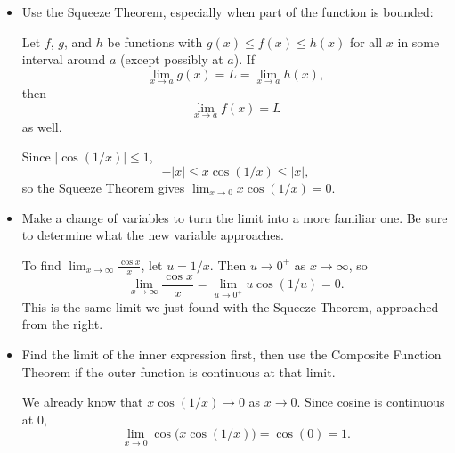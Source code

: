 \begin{itemize}
\item Use the Squeeze Theorem, especially when part of the function is bounded:

\begin{thm}
Let $f$, $g$, and $h$ be functions with $g(x)\leq f(x)\leq h(x)$ for all $x$ in some interval around $a$ (except possibly at $a$). If $$\lim_{x\to a}g(x)=L=\lim_{x\to a} h(x),$$ then $$\lim_{x\to a} f(x)=L$$
as well.
\end{thm}
\begin{exampleblock}
Since $\left|\cos(1/x)\right|\leq 1$,
$$-|x|\leq x\cos(1/x)\leq |x|,$$
so the Squeeze Theorem gives $\displaystyle\lim_{x\to0}x\cos(1/x)=0$.
\end{exampleblock}

\item Make a change of variables to turn the limit into a more familiar one. Be sure to determine what the new variable approaches.
\begin{exampleblock}
To find $\displaystyle\lim_{x\to\infty}\frac{\cos x}{x}$,
let $u=1/x$. Then $u\to0^+$ as $x\to\infty$, so
$$\lim_{x\to\infty}\frac{\cos x}{x}
=\lim_{u\to0^+}u\cos(1/u)=0.$$
This is the same limit we just found with the Squeeze Theorem, approached
from the right.
\end{exampleblock}

\item Find the limit of the inner expression first, then use the Composite Function Theorem if the outer function is continuous at that limit.
\begin{exampleblock}
We already know that $x\cos(1/x)\to0$ as $x\to0$.
Since cosine is continuous at $0$,
$$\lim_{x\to0}\cos\bigl(x\cos(1/x)\bigr)=\cos(0)=1.$$
\end{exampleblock}

\end{itemize}
